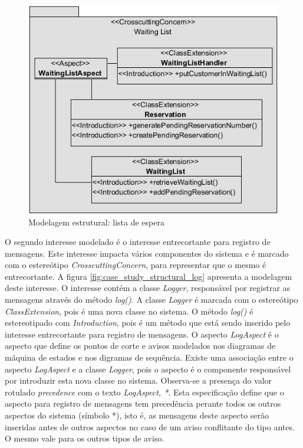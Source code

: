   \begin{figure}[!h]
	\centering
	\includegraphics{img/case_study_structural_waiting_list.png}
	\caption{Modelagem estrutural: lista de espera}\label{fig:case_study_structural_waiting_list}
  \end{figure}

O segundo interesse modelado é o interesse entrecortante para registro de mensagens. Este interesse impacta vários componentes do sistema e é
marcado com o estereótipo \textit{CrosscuttingConcern}, para representar que o mesmo é entrecortante. A figura \ref{fig:case_study_structural_log}
apresenta a modelagem deste interesse. O interesse contém a classe \textit{Logger}, responsável por registrar as mensagens através do método
\textit{log()}. A classe \textit{Logger} é marcada com o estereótipo \textit{ClassExtension}, pois é uma nova classe no sistema. O método
\textit{log()} é estereotipado com \textit{Introduction}, pois é um método que está sendo inserido pelo interesse entrecortante para registro de mensagens. 
O aspecto \textit{LogAspect} é o aspecto que define os pontos de corte e avisos modelados nos diagramas de máquina de estados e nos digramas de
sequência. Existe uma associação entre o aspecto \textit{LogAspect} e a classe \textit{Logger}, pois o aspecto é o componente responsável por introduzir esta 
nova classe no sistema. Observa-se a presença do valor rotulado \textit{precedence} com o texto \textit{LogAspect, *}. Esta especificação define que o
aspecto para registro de mensagens tem precedência perante todos os outros aspectos do sistema (símbolo *), isto é, as mensagens deste aspecto serão
inseridas antes de outros aspectos no caso de um aviso conflitante do tipo antes. O mesmo vale para os outros tipos de aviso.

